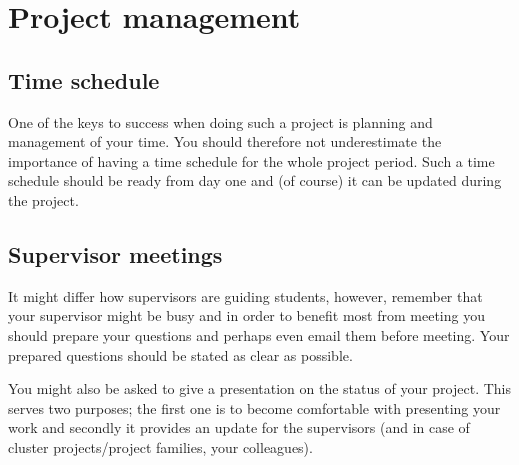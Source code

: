 \chapter{Project management}

\section{Time schedule}
One of the keys to success when doing such a project is planning and management of your time. You should therefore not underestimate the importance of having a time schedule for the whole project period. Such a time schedule should be ready from day one and (of course) it can be updated during the project. 


\section{Supervisor meetings}
It might differ how supervisors are guiding students, however, remember that your supervisor might be busy and in order to benefit most from meeting you should prepare your questions and perhaps even email them before meeting. Your prepared questions should be stated as clear as possible.

You might also be asked to give a presentation on the status of your project. This serves two purposes; the first one is to become comfortable with presenting your work and secondly it provides an update for the supervisors (and in case of cluster projects/project families, your colleagues).

